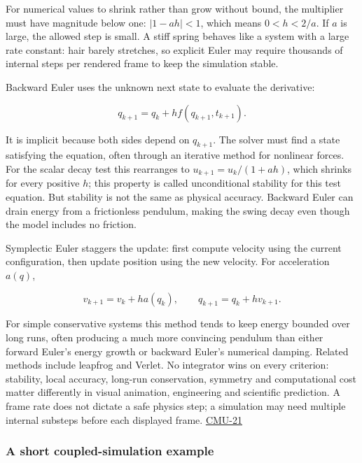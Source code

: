 For numerical values to shrink rather than grow without bound, the multiplier must have magnitude below one: \(|1-ah|<1\), which means \(0<h<2/a\). If \(a\) is large, the allowed step is small. A stiff spring behaves like a system with a large rate constant: hair barely stretches, so explicit Euler may require thousands of internal steps per rendered frame to keep the simulation stable.

Backward Euler uses the unknown next state to evaluate the derivative:

\[
q_{k+1}=q_k+h f(q_{k+1},t_{k+1}).
\]

It is implicit because both sides depend on \(q_{k+1}\). The solver must find a state satisfying the equation, often through an iterative method for nonlinear forces. For the scalar decay test this rearranges to \(u_{k+1}=u_k/(1+ah)\), which shrinks for every positive \(h\); this property is called unconditional stability for this test equation. But stability is not the same as physical accuracy. Backward Euler can drain energy from a frictionless pendulum, making the swing decay even though the model includes no friction.

Symplectic Euler staggers the update: first compute velocity using the current configuration, then update position using the new velocity. For acceleration \(a(q)\),

\[
v_{k+1}=v_k+h a(q_k),\qquad q_{k+1}=q_k+h v_{k+1}.
\]

For simple conservative systems this method tends to keep energy bounded over long runs, often producing a much more convincing pendulum than either forward Euler's energy growth or backward Euler's numerical damping. Related methods include leapfrog and Verlet. No integrator wins on every criterion: stability, local accuracy, long-run conservation, symmetry and computational cost matter differently in visual animation, engineering and scientific prediction. A frame rate does not dictate a safe physics step; a simulation may need multiple internal substeps before each displayed frame. \hyperref[04-visual-computing-ii-ch036]{CMU-21}

\subsubsection{A short coupled-simulation example}\label{a-short-coupled-simulation-example}

